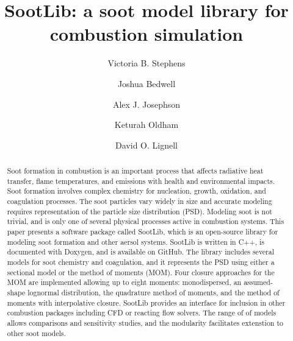 \documentclass[preprint,letterpaper]{elsarticle}
\begin{document}
\begin{frontmatter}



\title{SootLib: a soot model library for combustion simulation}


\author{Victoria B. Stephens}
\author{Joshua Bedwell}
\author{Alex J. Josephson}
\author{Keturah Oldham}
\author{David O. Lignell}


\address{Chemical Engineering Department, Brigham Young University, Provo, UT 84602, USA}

\begin{abstract}
%
Soot formation in combustion is an important process that affects radiative heat transfer, flame temperatures, and emissions with health and environmental impacts. Soot formation involves complex chemistry for nucleation, growth, oxidation, and coagulation processes. The soot particles vary widely in size and accurate modeling requires representation of the particle size distribution (PSD). Modeling soot is not trivial, and is only one of several physical processes active in combustion systems. This paper presents a software package called SootLib, which is an open-source library for modeling soot formation and other aersol systems. SootLib is written in C++, is documented with Doxygen, and is available on GitHub. The library includes several models for soot chemistry and coagulation, and it represents the PSD using either a sectional model or the method of moments (MOM). Four closure approaches for the MOM are implemented allowing up to eight moments: monodispersed, an assumed-shape lognormal distribution, the quadrature method of moments, and the method of moments with interpolative closure. SootLib provides an interface for inclusion in other combustion packages including CFD or reacting flow solvers. The range of of models allows comparisons and sensitivity studies, and the modularity facilitates extenstion to other soot models.
%
\end{abstract}


\end{frontmatter}
\end{document}
